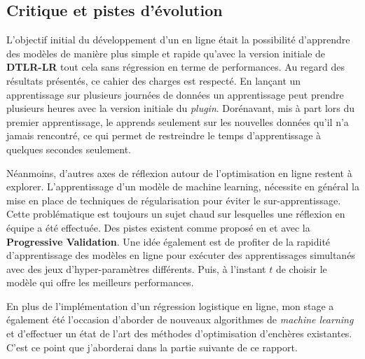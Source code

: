     \subsection{Critique et pistes d'évolution}
        L'objectif initial du développement d'un \bo en ligne était la possibilité d'apprendre des modèles de manière plus simple et rapide qu'avec la version initiale de \textbf{DTLR-LR} tout cela sans régression en terme de performances. Au regard des résultats présentés, ce cahier des charges est respecté. En lançant un apprentissage sur plusieurs journées de données un apprentissage peut prendre plusieurs heures avec la version initiale du \emph{plugin}. Dorénavant, mis à part lors du premier apprentissage, le \bo apprends seulement sur les nouvelles données qu'il n'a jamais rencontré, ce qui permet de restreindre le temps d'apprentissage à quelques secondes seulement. \par
        Néanmoins, d'autres axes de réflexion autour de l'optimisation en ligne restent à explorer. L'apprentissage d'un modèle de machine learning, nécessite en général la mise en place de techniques de régularisation pour éviter le sur-apprentissage. Cette problématique est toujours un sujet chaud sur lesquelles une réflexion en équipe a été effectuée. Des pistes existent comme proposé en \cite{do2009proximal} et \cite{mcmahan2013ad} avec la \textbf{Progressive Validation}. Une idée également est de profiter de la rapidité d'apprentissage des modèles en ligne pour exécuter des apprentissages simultanés avec des jeux d'hyper-paramètres différents. Puis, à l'instant $t$ de choisir le modèle qui offre les meilleurs performances. \par
        En plus de l'implémentation d'un régression logistique en ligne, mon stage a également été l'occasion d'aborder de nouveaux algorithmes de \emph{machine learning} et d'effectuer un état de l'art des méthodes d'optimisation d'enchères existantes. C'est ce point que j'aborderai dans la partie suivante de ce rapport.
    
